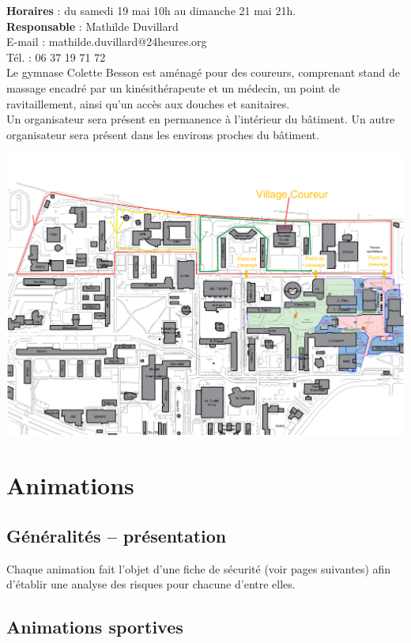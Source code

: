 \documentclass[hidelinks, paper=a4, fontsize=13pt]{report}
\begin{document}
\textbf{Horaires} : du samedi 19 mai 10h au dimanche 21 mai 21h.\\

\textbf{Responsable} : Mathilde Duvillard\\
	E-mail : mathilde.duvillard@24heures.org\\
	Tél. : 06 37 19 71 72\\

Le gymnase Colette Besson est aménagé pour des coureurs, comprenant stand de massage encadré par un kinésithérapeute et un médecin, un point de ravitaillement, ainsi qu’un accès aux douches et sanitaires.\\

Un organisateur sera présent en permanence à l’intérieur du bâtiment. Un autre organisateur sera présent dans les environs proches du bâtiment. \\

\begin{center}
\includegraphics[width=.8\textwidth,keepaspectratio]{Exports/Plan_24h_44eme-Parcours_courses}
\end{center}
\newpage
\section{Animations}
\subsection{Généralités – présentation}


Chaque animation fait l’objet d’une fiche de sécurité (voir pages suivantes) afin d’établir une analyse des risques pour chacune d’entre elles.

\subsection{Animations sportives}
\end{document}
